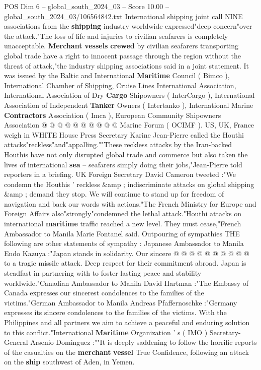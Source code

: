 \begin{textsample}{POS Dim 6 – global\_south\_2024\_03 – Score 10.00 – global\_south\_2024\_03/106564842.txt}
International shipping joint call NINE associations from the \textbf{shipping} industry worldwide expressed"deep concern"over the attack."The loss of life and injuries to civilian seafarers is completely unacceptable. \textbf{Merchant} \textbf{vessels} \textbf{crewed} by civilian seafarers transporting global trade have a right to innocent passage through the region without the threat of attack,"the industry shipping associations said in a joint statement.
It was issued by the Baltic and International \textbf{Maritime} Council ( Bimco ), International Chamber of Shipping, Cruise Lines International Association, International Association of Dry \textbf{Cargo} Shipowners ( InterCargo ), International Association of Independent \textbf{Tanker} Owners ( Intertanko ), International Marine \textbf{Contractors} Association ( Imca ), European Community Shipowners Association @ @ @ @ @ @ @ @ @ @ Marine Forum ( OCIMF ).
US, UK, France weigh in WHITE House Press Secretary Karine Jean-Pierre called the Houthi attacks"reckless"and"appalling.""These reckless attacks by the Iran-backed Houthis have not only disrupted global trade and commerce but also taken the lives of international \textbf{sea} -- seafarers simply doing their jobs,"Jean-Pierre told reporters in a briefing.
UK Foreign Secretary David Cameron tweeted :"We condemn the Houthis ' reckless \&amp ; indiscriminate attacks on global shipping \&amp ; demand they stop.
We will continue to stand up for freedom of navigation and back our words with actions."The French Ministry for Europe and Foreign Affairs also"strongly"condemned the lethal attack."Houthi attacks on international \textbf{maritime} traffic reached a new level.
They must cease,"French Ambassador to Manila Marie Fontanel said.
Outpouring of sympathies THE following are other statements of sympathy : Japanese Ambassador to Manila Endo Kazuya :"Japan stands in solidarity.
Our sincere @ @ @ @ @ @ @ @ @ @ to a tragic missile attack.
Deep respect for their commitment abroad.
Japan is steadfast in partnering with to foster lasting peace and stability worldwide."Canadian Ambassador to Manila David Hartman :"The Embassy of Canada expresses our sincerest condolences to the families of the victims."German Ambassador to Manila Andreas Pfaffernoschke :"Germany expresses its sincere condolences to the families of the victims.
With the Philippines and all partners we aim to achieve a peaceful and enduring solution to this conflict."International \textbf{Maritime} Organization ' s ( IMO ) Secretary-General Arsenio Dominguez :""It is deeply saddening to follow the horrific reports of the casualties on the \textbf{merchant} \textbf{vessel} True Confidence, following an attack on the \textbf{ship} southwest of Aden, in Yemen.

\end{textsample}
